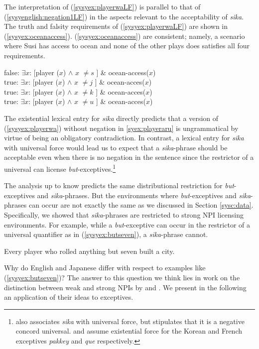\documentclass[output=paper,colorlinks,citecolor=brown,
]{langscibook}
\def\refp#1{(\ref{sy#1})}
\begin{document}
The interpretation of \refp{syex:playerwaLF} is parallel to that of \refp{syenglish:negation1LF} in the aspects relevant to the acceptability of \emph{sika}.
The truth and falsity requirements of \refp{syex:playerwaLF} are shown in \refp{syex:oceanaccess}.
\refp{syex:oceanaccess} are consistent; namely, a scenario where Susi has  access to ocean and none of the other plays does satisfies all four requirements.

\ea \label{syex:oceanaccess}
    false: $\exists x$: [player ($x$) $\land$ $x$ $\neq s$ ] \& ocean-access($x$)\\
    true: $\exists x$: [player ($x$) $\land$ $x$ $\neq j$ ] \& ocean-acces($x$)\\
	  true: $\exists x$: [player ($x$) $\land$ $x$ $\neq k$ ] \& ocean-acces($x$)\\
    true: $\exists x$: [player ($x$) $\land$ $x$ $\neq u$ ] \& ocean-acces($x$)\z


The existential lexical entry for \emph{sika} directly predicts that a version of \refp{syex:playerwa} without negation in \ref{syex:playeraru} is ungrammatical by virtue of being an obligatory contradiction. In contrast, a lexical entry for \emph{sika} with universal force \citep{alonso-ovalle04a,kawahara08a,yoshimura06a} would lead us to expect that a \emph{sika}-phrase should be acceptable even when there is no negation in the sentence since the restrictor of a universal can license \emph{but}-exceptives.\footnote{\cite{shimoyama11} also associates \emph{sika} with universal force, but stipulates that it is a negative concord universal.  \cite{sells01a} and \cite{fintel07a} assume existential force for the Korean and French exceptives \emph{pakkey} and \emph{que} respectively.} 

The analysis up to know predicts the same distributional restriction for \emph{but}-exceptives and \emph{sika}-phrases.
But the environments where \emph{but}-exceptives and \emph{sika}-phrases can occur are not exactly the same as we discussed in Section \ref{sysc:data}.
Specifically, we showed that \emph{sika}-phrases are restricted to strong NPI licensing environments. 
For example,  while a \emph{but}-exceptive can occur in the restrictor of a universal quantifier as in \refp{syex:butseven}, a \emph{sika}-phrase cannot.

\ea \label{syex:butseven}
Every player who rolled anything but seven built a city.\z

Why do English and Japanese differ with respect to examples like \refp{syex:butseven}?
The answer to this question we think lies in work on the distinction between weak and strong NPIs by \cite{gajewski11a} and \cite{chierchia13a}.
We present in the following an application of their ideas to exceptives.  
\end{document}
